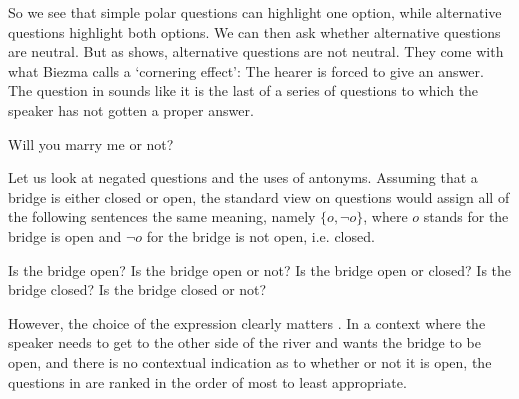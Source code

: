 \documentclass[output=paper,colorlinks,citecolor=brown]{langscibook}
\begin{document}
So we see that simple polar questions can highlight one option, while alternative questions highlight both options. We can then ask whether alternative questions are neutral. But as \citet{biezma2019alternative} shows, alternative questions are not neutral. They come with what Biezma calls a `cornering effect': The hearer is forced to give an answer. The question in  sounds like it is the last of a series of questions to which the speaker has not gotten a proper answer.




\ea \label{marryornot}
Will you marry me or not?
\z


Let us look at negated questions and the uses of antonyms. Assuming that a bridge is either closed or open, the standard view on questions would assign all of the following sentences the same meaning, namely $\{o, \neg o\}$, where $o$ stands for the bridge is open and $\neg o$ for the bridge is not open, i.e. closed.

\ea\label{bridgequestions}
\ea
Is the bridge open?\label{whetheropen}
\ex \label{openornot}
Is the bridge open or not?
\ex
Is the bridge open or closed?
\ex \label{closed}
Is the bridge closed?
\ex \label{closedornot}
Is the bridge closed or not?
\z
\z

However, the choice of the expression clearly matters \citep{vanrooysafarova2003polar, bustamente2012real, roelofsengool2010disjunctive, trinh2014how}.
In a context where the speaker needs to get to the other side of the river and wants the bridge to be open, and there is no contextual indication as to whether or not it is open, the questions in  are ranked in the order of most to least appropriate. %
\end{document}
